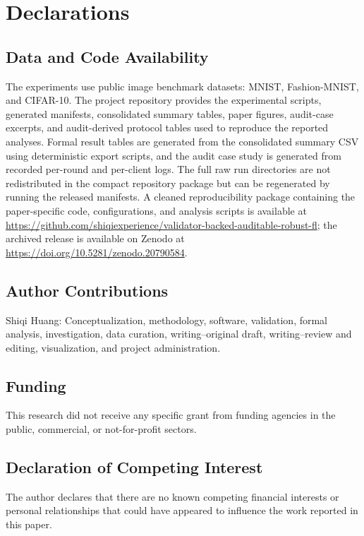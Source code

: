 \documentclass[preprint,12pt]{elsarticle}
\begin{document}
\section{Declarations}

\subsection{Data and Code Availability}

The experiments use public image benchmark datasets: MNIST, Fashion-MNIST, and CIFAR-10. The project repository provides the experimental scripts, generated manifests, consolidated summary tables, paper figures, audit-case excerpts, and audit-derived protocol tables used to reproduce the reported analyses. Formal result tables are generated from the consolidated summary CSV using deterministic export scripts, and the audit case study is generated from recorded per-round and per-client logs. The full raw run directories are not redistributed in the compact repository package but can be regenerated by running the released manifests. A cleaned reproducibility package containing the paper-specific code, configurations, and analysis scripts is available at \url{https://github.com/shiqiexperience/validator-backed-auditable-robust-fl}; the archived release is available on Zenodo at \url{https://doi.org/10.5281/zenodo.20790584}.

\subsection{Author Contributions}

Shiqi Huang: Conceptualization, methodology, software, validation, formal analysis, investigation, data curation, writing--original draft, writing--review and editing, visualization, and project administration.

\subsection{Funding}

This research did not receive any specific grant from funding agencies in the public, commercial, or not-for-profit sectors.

\subsection{Declaration of Competing Interest}

The author declares that there are no known competing financial interests or personal relationships that could have appeared to influence the work reported in this paper.
\end{document}
